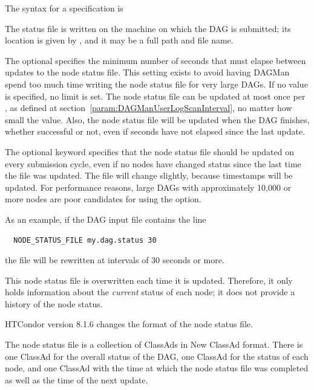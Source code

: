 The syntax for a  specification is

  

The status file is written on the machine on which the DAG is submitted;
its location is given by ,
and it may be a full path and file name.

The optional  specifies the minimum number of seconds
that must elapse between updates to the node status file.
This setting exists to avoid having DAGMan spend too much time writing
the node status file for very large DAGs.
If no value is specified, no limit is set.
The node status file can be updated at most once
per ,
as defined at section~\ref{param:DAGManUserLogScanInterval},
no matter how small the  value.
Also, the node status file will be updated when the DAG finishes,
whether successful or not, even if  seconds
have not elapsed since the last update.

The optional  keyword specifies that the
node status file should be updated on every submission cycle,
even if no nodes have changed status since the last time the
file was updated.
The file will change slightly,
because timestamps will be updated.
For performance reasons,
large DAGs with approximately 10,000 or more nodes
are poor candidates for using the  option.

As an example, if the DAG input file contains the line
\begin{verbatim}
  NODE_STATUS_FILE my.dag.status 30
\end{verbatim}
the file  will be rewritten at intervals of 30 seconds
or more.

This node status file is overwritten each time it is updated.
Therefore, it only holds information about the \emph{current} status 
of each node; it does not provide a history of the node status.

\Note HTCondor version 8.1.6 changes the format of the node status
file.

The node status file is a collection of ClassAds in New ClassAd format.
There is one ClassAd for the overall status of the DAG, one ClassAd
for the status of each node, and one ClassAd with the time at which
the node status file was completed as well as the time of the next update.

